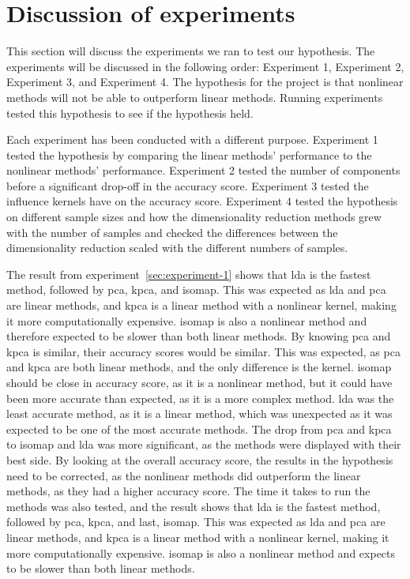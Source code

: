 \section{Discussion of experiments} \label{sec:experiments}
This section will discuss the experiments we ran to test our hypothesis. The experiments will be discussed in the following order: Experiment 1, Experiment 2, Experiment 3, and Experiment 4. The hypothesis for the project is that nonlinear methods will not be able to outperform linear methods. Running experiments tested this hypothesis to see if the hypothesis held. 

Each experiment has been conducted with a different purpose. Experiment 1 tested the hypothesis by comparing the linear methods' performance to the nonlinear methods' performance. Experiment 2 tested the number of components before a significant drop-off in the accuracy score. Experiment 3 tested the influence kernels have on the accuracy score. Experiment 4 tested the hypothesis on different sample sizes and how the dimensionality reduction methods grew with the number of samples and checked the differences between the dimensionality reduction scaled with the different numbers of samples.

The result from experiment~\ref{sec:experiment-1} shows that \gls{lda} is the fastest method, followed by \gls{pca}, \gls{kpca}, and \gls{isomap}. This was expected as \gls{lda} and \gls{pca} are linear methods, and \gls{kpca} is a linear method with a nonlinear kernel, making it more computationally expensive. \gls{isomap} is also a nonlinear method and therefore expected to be slower than both linear methods. By knowing \gls{pca} and \gls{kpca} is similar, their accuracy scores would be similar. This was expected, as \gls{pca} and \gls{kpca} are both linear methods, and the only difference is the kernel. \gls{isomap} should be close in accuracy score, as it is a nonlinear method, but it could have been more accurate than expected, as it is a more complex method. \gls{lda} was the least accurate method, as it is a linear method, which was unexpected as it was expected to be one of the most accurate methods. The drop from \gls{pca} and \gls{kpca} to \gls{isomap} and \gls{lda} was more significant, as the methods were displayed with their best side. By looking at the overall accuracy score, the results in the hypothesis need to be corrected, as the nonlinear methods did outperform the linear methods, as they had a higher accuracy score. The time it takes to run the methods was also tested, and the result shows that \gls{lda} is the fastest method, followed by \gls{pca}, \gls{kpca}, and last, \gls{isomap}. This was expected as \gls{lda} and \gls{pca} are linear methods, and \gls{kpca} is a linear method with a nonlinear kernel, making it more computationally expensive. \gls{isomap} is also a nonlinear method and expects to be slower than both linear methods.


